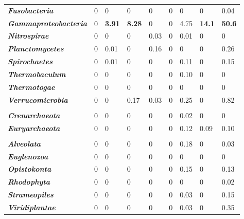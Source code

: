 \begin{table}
\begin{tabularx}{\textwidth}{p{3.5cm}p{0.6cm}p{0.8cm}p{0.8cm}p{0.6cm}p{0.5cm}p{1cm}XX}
\textbf{\emph{Fusobacteria}} & 0 & 0 & 0 & 0 & 0 & 0 & 0 & 0.04 \\
\textbf{\emph{Gammaproteobacteria}} & 0 & \textbf{3.91} & \textbf{8.28} & 0 & 0 & 4.75 & \textbf{14.1} & \textbf{50.6} \\
\textbf{\emph{Nitrospirae}} & 0 & 0 & 0 & 0.03 & 0 & 0.01 & 0 & 0 \\
\textbf{\emph{Planctomycetes}} & 0 & 0.01 & 0 & 0.16 & 0 & 0 & 0 & 0.26 \\
\textbf{\emph{Spirochaetes}} & 0 & 0.01 & 0 & 0 & 0 & 0.11 & 0 & 0.15 \\
\textbf{\emph{Thermobaculum}} & 0 & 0 & 0 & 0 & 0 & 0.10 & 0 & 0 \\
\textbf{\emph{Thermotogae}} & 0 & 0 & 0 & 0 & 0 & 0 & 0 & 0 \\
\textbf{\emph{Verrucomicrobia}} & 0 & 0 & 0.17 & 0.03 & 0 & 0.25 & 0 & 0.82 \\
 &  &  &  &  &  &  &  &  \\
\textbf{\emph{Crenarchaeota}} & 0 & 0 & 0 & 0 & 0 & 0.02 & 0 & 0 \\
\textbf{\emph{Euryarchaeota}} & 0 & 0 & 0 & 0 & 0 & 0.12 & 0.09 & 0.10 \\
 &  &  &  &  &  &  &  &  \\
\textbf{\emph{Alveolata}} & 0 & 0 & 0 & 0 & 0 & 0.18 & 0 & 0.03 \\
\textbf{\emph{Euglenozoa}} & 0 & 0 & 0 & 0 & 0 & 0 & 0 & 0 \\
\textbf{\emph{Opistokonta}} & 0 & 0 & 0 & 0 & 0 & 0.15 & 0 & 0.13 \\
\textbf{\emph{Rhodophyta}} & 0 & 0 & 0 & 0 & 0 & 0 & 0 & 0.02 \\
\textbf{\emph{Strameopiles}} & 0 & 0 & 0 & 0 & 0 & 0.03 & 0 & 0.15 \\
\textbf{\emph{Viridiplantae}} & 0 & 0 & 0 & 0 & 0 & 0.03 & 0 & 0.35 \\
\bottomrule
\end{tabularx}
\end{table}

